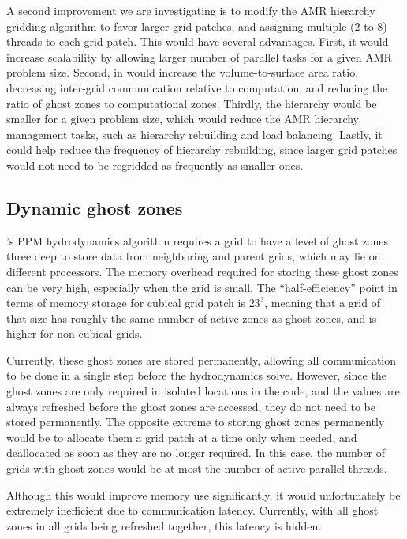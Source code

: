 \documentclass{article}
\begin{document}
 A second improvement we are investigating is to modify the AMR
 hierarchy gridding algorithm to favor larger grid patches, and
 assigning multiple ($2$ to $8$) threads to each grid patch.  This
 would have several advantages.  First, it would increase scalability
 by allowing larger number of parallel tasks for a given AMR problem
 size.  Second, in would increase the volume-to-surface area ratio,
 decreasing inter-grid communication relative to computation, and
 reducing the ratio of ghost zones to computational zones.  Thirdly,
 the hierarchy would be smaller for a given problem size, which would
 reduce the AMR hierarchy management tasks, such as hierarchy
 rebuilding and load balancing.  Lastly, it could help reduce the
 frequency of hierarchy rebuilding, since larger grid patches would
 not need to be regridded as frequently as smaller ones.

\subsection{Dynamic ghost zones} \label{solution:amr-dynamic-ghosts}

  \enzo's PPM hydrodynamics algorithm requires a grid to have a level
  of ghost zones three deep to store data from neighboring and parent
  grids, which may lie on different processors.  The memory overhead
  required for storing these ghost zones can be very high, especially
  when the grid is small.  The ``half-efficiency'' point in terms of
  memory storage for cubical grid patch is $23^3$, meaning that a grid
  of that size has roughly the same number of active zones as ghost
  zones, and is higher for non-cubical grids.

  Currently, these ghost zones are stored permanently, allowing all
  communication to be done in a single step before the hydrodynamics
  solve.  However, since the ghost zones are only required in isolated
  locations in the code, and the values are always refreshed before
  the ghost zones are accessed, they do not need to be stored
  permanently.  The opposite extreme to storing ghost zones
  permanently would be to allocate them a grid patch at a time only
  when needed, and deallocated as soon as they are no longer required.
  In this case, the number of grids with ghost zones would be at most
  the number of active parallel threads.

  Although this would improve memory use significantly, it would
  unfortunately be extremely inefficient due to communication latency.
  Currently, with all ghost zones in all grids being refreshed
  together, this latency is hidden.
\end{document}
